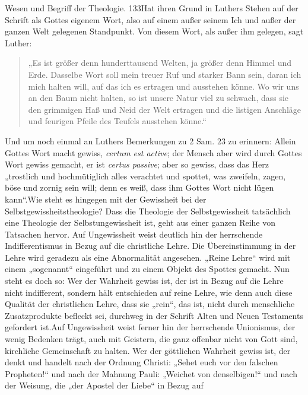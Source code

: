 \noindent Wesen und Begriff der Theologie. \hfill 133\vspace{1em}Hat ihren Grund in Luthers Stehen auf der Schrift als Gottes eigenem Wort, also auf einem außer seinem Ich und außer der ganzen Welt gelegenen Standpunkt. Von diesem Wort, als außer ihm gelegen, sagt Luther:\begin{quote}„Es ist größer denn hunderttausend Welten, ja größer denn Himmel und Erde. Dasselbe Wort soll mein treuer Ruf und starker Bann sein, daran ich mich halten will, auf das ich es ertragen und ausstehen könne. Wo wir uns an den Baum nicht halten, so ist unsere Natur viel zu schwach, dass sie den grimmigen Haß und Neid der Welt ertragen und die listigen Anschläge und feurigen Pfeile des Teufels ausstehen könne.“\footnotemark[470]\end{quote}Und um noch einmal an Luthers Bemerkungen zu 2 Sam. 23 zu erinnern: Allein Gottes Wort macht gewiss, \textit{certum est active}; der Mensch aber wird durch Gottes Wort gewiss gemacht, er ist \textit{certus passive}; aber so gewiss, dass das Herz „trostlich und hochmütiglich alles verachtet und spottet, was zweifeln, zagen, böse und zornig sein will; denn es weiß, dass ihm Gottes Wort nicht lügen kann“.\footnotemark[471]Wie steht es hingegen mit der Gewissheit bei der Selbstgewissheitstheologie? Dass die Theologie der Selbstgewissheit tatsächlich eine Theologie der Selbstungewissheit ist, geht aus einer ganzen Reihe von Tatsachen hervor. Auf Ungewissheit weist deutlich hin der herrschende Indifferentismus in Bezug auf die christliche Lehre. Die Übereinstimmung in der Lehre wird geradezu als eine Abnormalität angesehen. „Reine Lehre“ wird mit einem „sogenannt“ eingeführt und zu einem Objekt des Spottes gemacht. Nun steht es doch so: Wer der Wahrheit gewiss ist, der ist in Bezug auf die Lehre nicht indifferent, sondern hält entschieden auf reine Lehre, wie denn auch diese Qualität der christlichen Lehre, dass sie „rein“, das ist, nicht durch menschliche Zusatzprodukte befleckt sei, durchweg in der Schrift Alten und Neuen Testaments gefordert ist.\footnotemark[472] Auf Ungewissheit weist ferner hin der herrschende Unionismus, der wenig Bedenken trägt, auch mit Geistern, die ganz offenbar nicht von Gott sind, kirchliche Gemeinschaft zu halten. Wer der göttlichen Wahrheit gewiss ist, der denkt und handelt nach der Ordnung Christi: „Sehet euch vor den falschen Propheten!“ und nach der Mahnung Pauli: „Weichet von denselbigen!“ und nach der Weisung, die „der Apostel der Liebe“ in Bezug auf\vspace{2em}